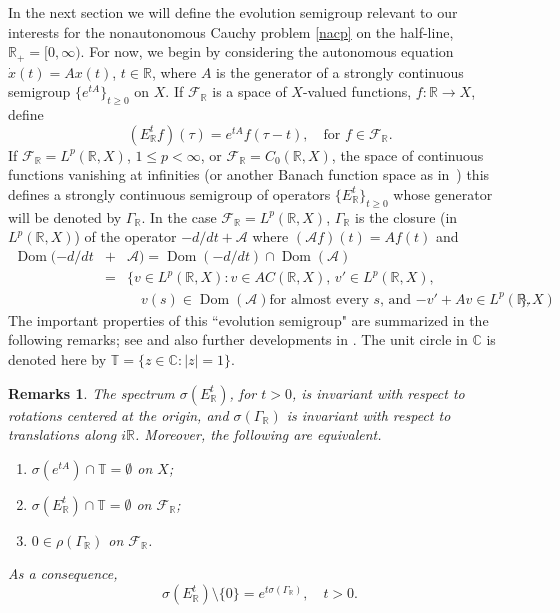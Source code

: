 \documentclass[10pt,psamsfonts,leqno]{siamltex}
\newtheorem{rmks}[prop]{Remarks}
\newcommand{\bbC}{\mathbb{C}}
\newcommand{\bbR}{\mathbb{R}}
\newcommand{\bbT}{\mathbb{T}}
\newcommand{\calA}{\mathcal{A}}
\newcommand{\Dom}{\operatorname{Dom}}
\renewcommand{\t}{\tau}
\newcommand{\lb}{\label}
\newcommand{\LpR}{{L^p(\bbR,X)}}
\begin{document}
In the next section we will define the  evolution semigroup relevant to
our interests for the nonautonomous Cauchy problem \eqref{nacp} on the
half-line, $\bbR_+=[0,\infty)$.  For now,  we begin by considering the
autonomous equation $\dot x(t)=Ax(t)$, $t\in\bbR$, where $A$ is the
generator of a strongly continuous semigroup  $\{e^{tA}\}_{t\ge 0}$ on
$X$.  If $\mathcal{F}_\bbR$ is a space of $X$-valued functions,
$f:\bbR\to X$, define
\begin{equation}\lb{AUTevolsgR}
(E_\bbR^tf)(\t)=e^{tA}f(\t-t),\quad \mbox{for }f\in \mathcal{F}_\bbR.
\end{equation}
If $\mathcal{F}_\bbR=\LpR$, $1\le p<\infty$, or
$\mathcal{F}_\bbR=C_0(\bbR,X)$, the
space of continuous functions vanishing at infinities (or another
Banach function space as in~\cite{RS1}) this defines a strongly
continuous  semigroup of operators $\{E_\bbR^t\}_{t\ge0}$ whose
generator will be  denoted by $\Gamma_\bbR$.  In the case
$\mathcal{F}_\bbR=\LpR$, $\Gamma_\bbR$ is the closure (in
$\LpR$) of the operator $-d/dt +\calA$ where $(\calA f)(t)= Af(t)$ and
 \begin{eqnarray*}
 \Dom(-d/dt&+&\calA)=\Dom(-d/dt)\cap\Dom (\calA)\\&=&
\{v\in \LpR : v\in AC(\bbR,X), \, v'\in \LpR,\\
&&\quad \text{$v(s)\in \Dom(\calA)$
for almost every~$s$, and $-v' +Av \in \LpR$}  \}.
\end{eqnarray*}
The important properties of this ``evolution semigroup"
 are summarized in the following remarks;
 see \cite{LMS2} and also further developments in
\cite{vanNbook,RS1,RolandDis}.
The unit circle in $\bbC$ is denoted here by $\bbT=\{z\in\bbC:|z|=1\}$.
\begin{rmks}\lb{AUTsmt}
The spectrum $\sigma(E_\bbR^t)$, for $t>0$, is invariant with respect to
rotations centered at the origin, and $\sigma(\Gamma_\bbR)$ is invariant
with respect to translations along $i\bbR$.  Moreover, the following are
equivalent.
\begin{enumerate}
\item $\sigma(e^{tA})\cap\bbT=\emptyset$ on $X$;
\item $\sigma(E_\bbR^t)\cap\bbT=\emptyset$ on $\mathcal{F}_\bbR$;
\item $0\in\rho(\Gamma_\bbR)$ on $\mathcal{F}_\bbR$.
\end{enumerate}
As a consequence,
\begin{equation}\label{ATsmt}
\sigma(E_\bbR^t)\setminus\{0\}=e^{t\sigma(\Gamma_\bbR)},\quad t>0.
\end{equation}
\end{rmks}
\end{document}
